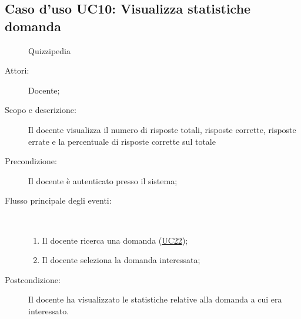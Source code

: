\subsection{Caso d'uso UC10: Visualizza statistiche domanda}
	\begin{figure}[H]
		\centering
		\begin{resizedtikzpicture}{\textwidth}
		\begin{umlsystem}[x=0, fill=lightgray!20]{Quizzipedia}
		\end{umlsystem}
		\end{resizedtikzpicture}
		\caption{}
	\end{figure}
\begin{description}
\item[Attori:] Docente;
\item[Scopo e descrizione:] Il docente visualizza il numero di risposte totali, risposte corrette, risposte errate e la percentuale di risposte corrette sul totale
      \item[Precondizione:] Il docente è autenticato presso il sistema;

        \item[Flusso principale degli eventi:] \ 
 \begin{enumerate}
          \item Il docente ricerca una domanda (\hyperlink{UC22}{UC22});
          \item Il docente seleziona la domanda interessata;

      \end{enumerate}
    \item[Postcondizione:] Il docente ha visualizzato le statistiche relative alla domanda a cui era interessato.
  \end{description}
\hypertarget{UC11}{}
